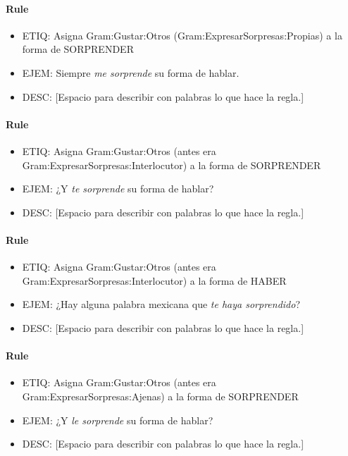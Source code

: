 \documentclass[11pt]{report}
\begin{document}
\paragraph*{Rule}
\begin{itemize}
\item ETIQ: Asigna Gram:Gustar:Otros (Gram:ExpresarSorpresas:Propias) a la forma de SORPRENDER
\item EJEM: Siempre \emph{me sorprende} su forma de hablar.
\item DESC: [Espacio para describir con palabras lo que hace la regla.]
\end{itemize}

\paragraph*{Rule}
\begin{itemize}
\item ETIQ: Asigna Gram:Gustar:Otros (antes era Gram:ExpresarSorpresas:Interlocutor) a la forma de SORPRENDER
\item EJEM: ¿Y \emph{te sorprende} su forma de hablar?
\item DESC: [Espacio para describir con palabras lo que hace la regla.]
\end{itemize}

\paragraph*{Rule}
\begin{itemize}
\item ETIQ: Asigna Gram:Gustar:Otros (antes era Gram:ExpresarSorpresas:Interlocutor) a la forma de HABER
\item EJEM: ¿Hay alguna palabra mexicana que \emph{te haya sorprendido}?
\item DESC: [Espacio para describir con palabras lo que hace la regla.]
\end{itemize}

\paragraph*{Rule}
\begin{itemize}
\item ETIQ: Asigna Gram:Gustar:Otros (antes era Gram:ExpresarSorpresas:Ajenas) a la forma de SORPRENDER
\item EJEM: ¿Y \emph{le sorprende} su forma de hablar?
\item DESC: [Espacio para describir con palabras lo que hace la regla.]
\end{itemize}
\end{document}
